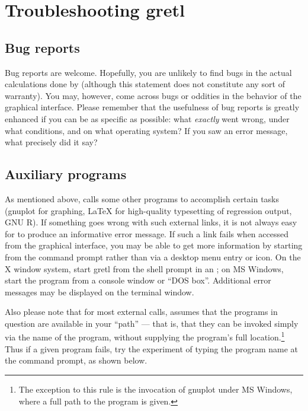 \chapter{Troubleshooting gretl}
\label{trouble}

\section{Bug reports}
\label{trouble-bugs}

Bug reports are welcome. Hopefully, you are unlikely to find bugs in
the actual calculations done by  (although this statement
does not constitute any sort of warranty). You may, however, come
across bugs or oddities in the behavior of the graphical interface.
Please remember that the usefulness of bug reports is greatly enhanced
if you can be as specific as possible: what \emph{exactly} went wrong,
under what conditions, and on what operating system?  If you saw an
error message, what precisely did it say?

\section{Auxiliary programs}
\label{trouble-programs}

As mentioned above,  calls some other programs to
accomplish certain tasks (gnuplot for graphing, {\LaTeX} for
high-quality typesetting of regression output, GNU R).  If something
goes wrong with such external links, it is not always easy for
 to produce an informative error message.  If such a link
fails when accessed from the  graphical interface, you may
be able to get more information by starting  from the
command prompt rather than via a desktop menu entry or icon.  On the X
window system, start gretl from the shell prompt in an ; on
MS Windows, start the program  from a console
window or ``DOS box''.  Additional error messages may be displayed on
the terminal window.

Also please note that for most external calls,  assumes
that the programs in question are available in your ``path'' --- that
is, that they can be invoked simply via the name of the program,
without supplying the program's full location.\footnote{The exception
  to this rule is the invocation of gnuplot under MS Windows, where a
  full path to the program is given.}  Thus if a given program fails,
try the experiment of typing the program name at the command prompt,
as shown below.

